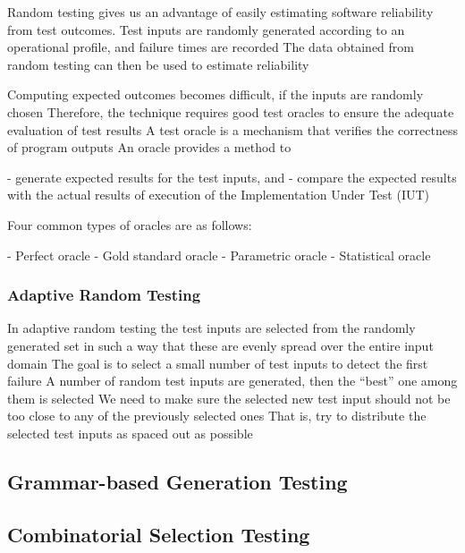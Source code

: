 \documentclass[citeauthoryear]{llncs}
\begin{document}
Random testing gives us an advantage of easily estimating software reliability from test outcomes.
Test inputs are randomly generated according to an operational
profile, and failure times are recorded The data obtained from random testing can then be used to estimate reliability

Computing expected outcomes becomes difficult, if the inputs are randomly chosen
Therefore, the technique requires good test oracles to ensure the adequate evaluation of test results
A test oracle is a mechanism that verifies the correctness of program outputs
An oracle provides a method to

- generate expected results for the test inputs, and
- compare the expected results with the actual results of execution of the Implementation Under Test (IUT)

Four common types of oracles are as follows:

- Perfect oracle
- Gold standard oracle
- Parametric oracle
- Statistical oracle

\subsubsection{Adaptive Random Testing}
In adaptive random testing the test inputs are selected from the
randomly generated set in such a way that these are evenly spread
over the entire input domain
The goal is to select a small number of test inputs to detect the first
failure
A number of random test inputs are generated, then the “best” one
among them is selected
We need to make sure the selected new test input should not be too
close to any of the previously selected ones
That is, try to distribute the selected test inputs as spaced out as
possible



\subsection{Grammar-based Generation Testing}

\subsection{Combinatorial Selection Testing}
\end{document}
